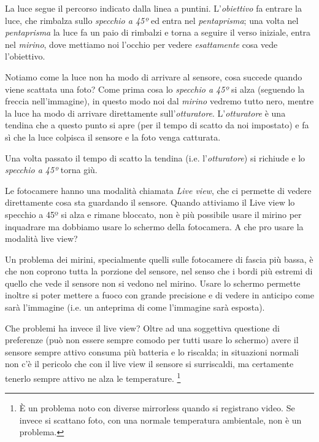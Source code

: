 La luce segue il percorso indicato dalla linea a puntini.\newline
L'\textit{obiettivo} fa entrare la luce, che rimbalza sullo \textit{specchio a 45º} ed entra nel \textit{pentaprisma}; una volta nel \textit{pentaprisma} la luce fa un paio di rimbalzi e torna a seguire il verso iniziale, entra nel \textit{mirino}, dove mettiamo noi l'occhio per vedere \textit{esattamente} cosa vede l'obiettivo.

Notiamo come la luce non ha modo di arrivare al sensore, cosa succede quando viene scattata una foto?\newline
Come prima cosa lo \textit{specchio a 45º} si alza (seguendo la freccia nell'immagine), in questo modo noi dal \textit{mirino} vedremo tutto nero, mentre la luce ha modo di arrivare direttamente sull'\textit{otturatore}.
L'\textit{otturatore} è una tendina che a questo punto si apre (per il tempo di scatto da noi impostato) e fa sì che la luce colpisca il sensore e la foto venga catturata.

Una volta passato il tempo di scatto la tendina (i.e. l'\textit{otturatore}) si richiude e lo \textit{specchio a 45º} torna giù.

Le fotocamere hanno una modalità chiamata \textit{Live view}, che ci permette di vedere direttamente cosa sta guardando il sensore. Quando attiviamo il Live view lo specchio a 45º si alza e rimane bloccato, non è più possibile usare il mirino per inquadrare ma dobbiamo usare lo schermo della fotocamera. A che pro usare la modalità live view?

Un problema dei mirini, specialmente quelli sulle fotocamere di fascia più bassa, è che non coprono tutta la porzione del sensore, nel senso che i bordi più estremi di quello che vede il sensore non si vedono nel mirino.
Usare lo schermo permette inoltre si poter mettere a fuoco con grande precisione e di vedere in anticipo come sarà l'immagine (i.e. un anteprima di come l'immagine sarà esposta).

Che problemi ha invece il live view? Oltre ad una soggettiva questione di preferenze (può non essere sempre comodo per tutti usare lo schermo) avere il sensore sempre attivo consuma più batteria e lo riscalda; in situazioni normali non c'è il pericolo che con il live view il sensore si surriscaldi, ma certamente tenerlo sempre attivo ne alza le temperature.
\footnote{È un problema noto con diverse mirrorless quando si registrano video. Se invece si scattano foto, con una normale temperatura ambientale, non è un problema.}


